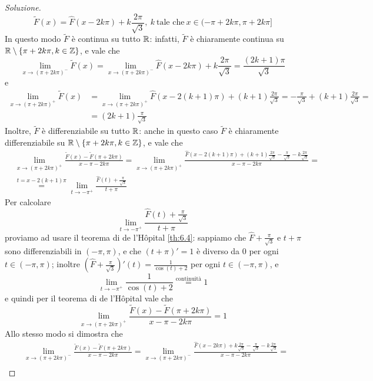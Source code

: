 \begin{proof}[Soluzione]
    \[
    \tilde{F}(x) = \widehat{F}(x-2k\pi)+k\frac{2\pi}{\sqrt{3}}, \ k \ \text{tale che} \ x\in(-\pi +2k\pi, \pi+2k\pi]
    \]
    In questo modo $\tilde{F}$ è continua su tutto $\amsbb{R}$: infatti, $\tilde{F}$ è chiaramente continua su $\amsbb{R}\setminus\{\pi + 2k\pi, k\in\amsbb{Z}\}$, e vale che
    \[
    \lim_{x\to (\pi+2k\pi)^-}\tilde{F}(x) = \lim_{x\to (\pi +2k\pi)^-} \widehat{F}(x-2k\pi) + k\frac{2\pi}{\sqrt{3}} = \frac{(2k+1)\pi}{\sqrt{3}}
    \]
    e
    \[
    \begin{split}
        \lim_{x\to (\pi+2k\pi)^+}\tilde{F}(x) & = \lim_{x\to (\pi +2k\pi)^+} \widehat{F}(x-2(k+1)\pi) + (k+1)\frac{2\pi}{\sqrt{3}} = -\frac{\pi}{\sqrt{3}} +  (k+1)\frac{2\pi}{\sqrt{3}}= \\
        & = (2k+1)\frac{\pi}{\sqrt{3}}
    \end{split}
    \]
    Inoltre, $\tilde{F}$ è differenziabile su tutto $\amsbb{R}$: anche in questo caso $\tilde{F}$ è chiaramente differenziabile su $\amsbb{R}\setminus\{\pi +2k\pi, k\in\amsbb{Z}\}$, e vale che
    \[
    \begin{split}
        &\lim_{x\to (\pi+2k\pi)^+}\frac{\tilde{F}(x)-\tilde{F}(\pi+2k\pi)}{x-\pi -2k\pi}= \lim_{x\to (\pi+2k\pi)^+}\frac{\widehat{F}(x-2(k+1)\pi)+(k+1)\frac{2\pi}{\sqrt{3}}-\frac{\pi}{\sqrt{3}}-k\frac{2\pi}{\sqrt{3}}}{x-\pi -2k\pi} = \\
        & \overset{t=x-2(k+1)\pi}{=} \lim_{t\to-\pi^+}\frac{\widehat{F}(t)+\frac{\pi}{\sqrt{3}}}{t+\pi}
    \end{split}
    \]
    Per calcolare
    \[
    \lim_{t\to-\pi^+}\frac{\widehat{F}(t)+\frac{\pi}{\sqrt{3}}}{t+\pi}
    \]
    proviamo ad usare il teorema di de l'H{\^o}pital \ref{th:6.4}: sappiamo che $\widehat{F}+\frac{\pi}{\sqrt{3}}$ e $t+\pi$ sono differenziabili in $(-\pi, \pi)$, e che $(t+\pi)' = 1$ è diverso da $0$ per ogni $t\in(-\pi, \pi)$; inoltre $(\widehat{F}+\frac{\pi}{\sqrt{3}})'(t) = \frac{1}{\cos(t)+2}$ per ogni $t\in (-\pi, \pi)$, e 
    \[
    \lim_{t\to -\pi^+} \frac{1}{\cos(t)+2} \overset{\text{continuità}}{=} 1
    \]
    e quindi per il teorema di de l'H{\^o}pital vale che
    \[
    \lim_{x\to (\pi+2k\pi)^+}\frac{\tilde{F}(x)-\tilde{F}(\pi+2k\pi)}{x-\pi -2k\pi}=1
    \]
    Allo stesso modo si dimostra che
    \[
    \begin{split}
        &\lim_{x\to (\pi+2k\pi)^-}\frac{\tilde{F}(x)-\tilde{F}(\pi+2k\pi)}{x-\pi -2k\pi}= \lim_{x\to (\pi+2k\pi)^-}\frac{\widehat{F}(x-2k\pi)+k\frac{2\pi}{\sqrt{3}}-\frac{\pi}{\sqrt{3}}-k\frac{2\pi}{\sqrt{3}}}{x-\pi -2k\pi} = \\

\end{split}\]
\end{proof}
